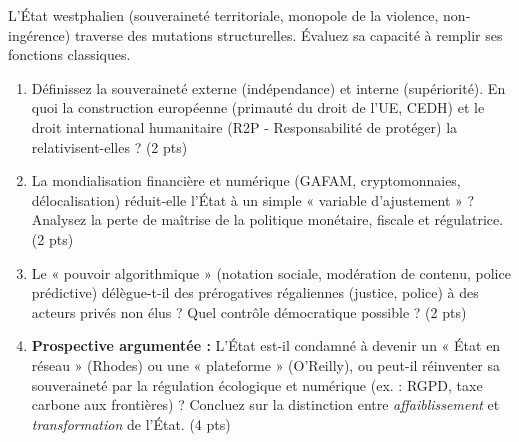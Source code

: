 \documentclass[11pt]{article}
\begin{document}
\begin{exercice}
L'État westphalien (souveraineté territoriale, monopole de la violence, non-ingérence) traverse des mutations structurelles. Évaluez sa capacité à remplir ses fonctions classiques.

\begin{enumerate}
    \item Définissez la souveraineté externe (indépendance) et interne (supériorité). En quoi la construction européenne (primauté du droit de l'UE, CEDH) et le droit international humanitaire (R2P - Responsabilité de protéger) la relativisent-elles ? (2 pts)
    \item La mondialisation financière et numérique (GAFAM, cryptomonnaies, délocalisation) réduit-elle l'État à un simple « variable d'ajustement » ? Analysez la perte de maîtrise de la politique monétaire, fiscale et régulatrice. (2 pts)
    \item Le « pouvoir algorithmique » (notation sociale, modération de contenu, police prédictive) délègue-t-il des prérogatives régaliennes (justice, police) à des acteurs privés non élus ? Quel contrôle démocratique possible ? (2 pts)
    \item \textbf{Prospective argumentée :} L'État est-il condamné à devenir un « État en réseau » (Rhodes) ou une « plateforme » (O'Reilly), ou peut-il réinventer sa souveraineté par la régulation écologique et numérique (ex. : RGPD, taxe carbone aux frontières) ? Concluez sur la distinction entre \emph{affaiblissement} et \emph{transformation} de l'État. (4 pts)
\end{enumerate}
\end{exercice}
\end{document}
